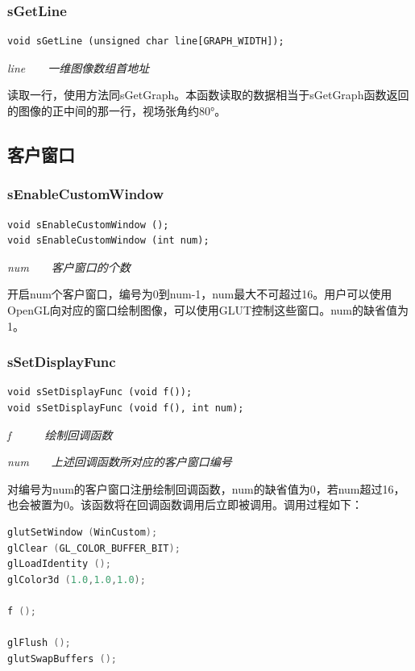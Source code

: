 \documentclass[titlepage,a4paper]{ctexart}
\begin{document}
\subsubsection{sGetLine}
\begin{lstlisting}[numbers=none]
void sGetLine (unsigned char line[GRAPH_WIDTH]);
\end{lstlisting}
\par \emph{line　　一维图像数组首地址}

读取一行，使用方法同sGetGraph。本函数读取的数据相当于sGetGraph函数返回的图像的正中间的那一行，视场张角约80°。 \\

\subsection{客户窗口}
\subsubsection{sEnableCustomWindow}
\begin{lstlisting}[numbers=none]
void sEnableCustomWindow ();
void sEnableCustomWindow (int num);
\end{lstlisting}
\par \emph{num　　客户窗口的个数}

开启num个客户窗口，编号为0到num-1，num最大不可超过16。用户可以使用OpenGL向对应的窗口绘制图像，可以使用GLUT控制这些窗口。num的缺省值为1。\\

\subsubsection{sSetDisplayFunc}
\hypertarget{h672}{}%
\begin{lstlisting}[numbers=none]
void sSetDisplayFunc (void f());
void sSetDisplayFunc (void f(), int num);
\end{lstlisting}
\par \emph{f　　　绘制回调函数}
\par \emph{num　　上述回调函数所对应的客户窗口编号}

对编号为num的客户窗口注册绘制回调函数，num的缺省值为0，若num超过16，也会被置为0。该函数将在回调函数调用后立即被调用。调用过程如下：
\begin{lstlisting}[language=C++]
glutSetWindow (WinCustom);
glClear (GL_COLOR_BUFFER_BIT);
glLoadIdentity ();
glColor3d (1.0,1.0,1.0);

f ();

glFlush ();
glutSwapBuffers ();
\end{lstlisting}
\end{document}
